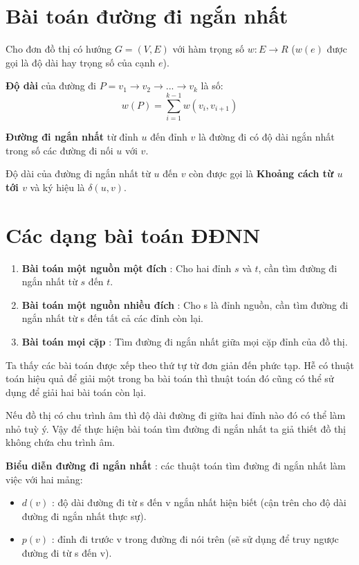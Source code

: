 \documentclass[../main-report.tex]{subfiles}
\begin{document}
\section{Bài toán đường đi ngắn nhất}

Cho đơn đồ thị có hướng $G = (V, E)$ với hàm trọng số $w: E \rightarrow R$ ($w(e)$ được gọi là độ dài hay trọng số của cạnh $e$).

\textbf{Độ dài} của đường đi $P = v_{1} \rightarrow v_{2} \rightarrow ... \rightarrow v_{k}$ là số:
$$w(P) = \sum^{k-1}_{i=1} w(v_{i}, v_{i+1})$$

\textbf{Đường đi ngắn nhất} từ đỉnh $u$ đến đỉnh $v$ là đường đi có độ dài ngắn nhất trong số các đường đi nối $u$ với $v$.

Độ dài của đường đi ngắn nhất từ $u$ đến $v$ còn được gọi là \textbf{Khoảng cách từ $u$ tới $v$} và ký hiệu là $\delta(u, v)$.

\section*{Các dạng bài toán ĐĐNN}
\begin{enumerate}
\item \textbf{Bài toán một nguồn một đích} : Cho hai đỉnh $s$ và $t$, cần tìm đường đi ngắn nhất từ $s$ đến $t$.
\item \textbf{Bài toán một nguồn nhiều đích} : Cho s là đỉnh nguồn, cần tìm đường đi ngắn nhất từ s đến tất cả các đỉnh còn lại.
\item \textbf{Bài toán mọi cặp} : Tìm đường đi ngắn nhất giữa mọi cặp đỉnh của đồ thị.
\end{enumerate}

Ta thấy các bài toán được xếp theo thứ tự từ đơn giản đến phức tạp. Hễ có thuật toán hiệu quả để giải một trong ba bài toán thì thuật toán đó cũng có thể sử dụng để giải hai bài toán còn lại.

Nếu đồ thị có chu trình âm thì độ dài đường đi giữa hai đỉnh nào đó có thể làm nhỏ tuỳ ý. Vậy để thực hiện bài toán tìm đường đi ngắn nhất ta giả thiết đồ thị không chứa chu trình âm.

\textbf{Biểu diễn đường đi ngắn nhất} : các thuật toán tìm đường đi ngắn nhất làm việc với hai mảng:
\begin{itemize}
    \item $d(v)$ : độ dài đường đi từ s đến v ngắn nhất hiện biết (cận trên cho độ dài đường đi ngắn nhất thực sự).
    \item $p(v)$ : đỉnh đi trước v trong đường đi nói trên (sẽ sử dụng để truy ngược đường đi từ s đến v).
\end{itemize}
\end{document}

